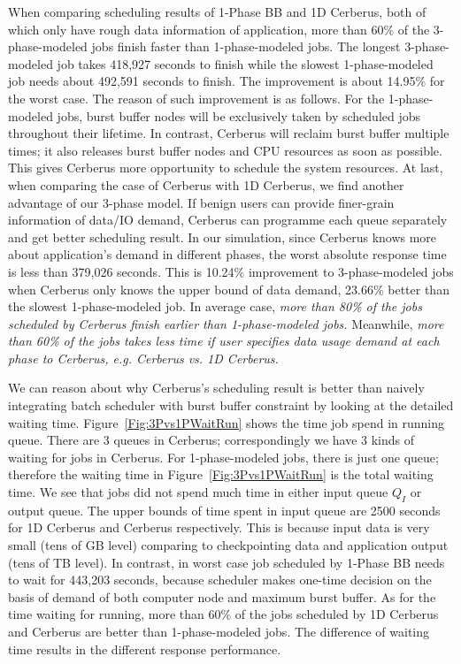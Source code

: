 When comparing scheduling results of 1-Phase BB and 1D Cerberus,
both of which only have rough data information of application,
more than 60\% of the 3-phase-modeled jobs finish faster than 1-phase-modeled jobs.
The longest 3-phase-modeled job takes 418,927 seconds to finish
while the slowest 1-phase-modeled job needs about 492,591 seconds to finish.
The improvement is about 14.95\% for the worst case.
The reason of such improvement is as follows.
For the 1-phase-modeled jobs, burst buffer nodes will be exclusively
taken by scheduled jobs throughout their lifetime.
In contrast, Cerberus will reclaim burst buffer multiple times;
it also releases burst buffer nodes and CPU resources as soon as possible.
This gives Cerberus more opportunity to schedule the system resources.
At last, when comparing the case of Cerberus with 1D Cerberus,
we find another advantage of our 3-phase model.
If benign users can provide finer-grain information of data/IO demand,
Cerberus can programme each queue separately and get better scheduling result.
In our simulation,
since Cerberus knows more about application's demand in different phases,
the worst absolute response time is less than 379,026 seconds.
This is 10.24\% improvement to 3-phase-modeled jobs
when Cerberus only knows the upper bound of data demand,
23.66\% better than the slowest 1-phase-modeled job.
In average case, \textit{more than 80\% of the jobs 
scheduled by Cerberus finish earlier than 1-phase-modeled jobs.}
Meanwhile, \textit{more than 60\% of the jobs takes less time if user 
specifies data usage demand at each phase to Cerberus, e.g. Cerberus vs. 1D Cerberus.}

We can reason about why Cerberus's scheduling result is better than
naively integrating batch scheduler with burst buffer constraint
by looking at the detailed waiting time.
Figure~\ref{Fig:3Pvs1PWaitRun} shows the time job spend in running queue.
There are 3 queues in Cerberus;
correspondingly we have 3 kinds of waiting for jobs in Cerberus.
For 1-phase-modeled jobs, there is just one queue;
therefore the waiting time in Figure~\ref{Fig:3Pvs1PWaitRun} is the total waiting time.
We see that jobs did not spend much time in either input queue $Q_I$ or output queue.
The upper bounds of time spent in input queue are
2500 seconds for 1D Cerberus and Cerberus respectively.
This is because input data is very small (tens of GB level)
comparing to checkpointing data and application output (tens of TB level).
In contrast, in worst case job scheduled by 1-Phase BB needs to wait for 443,203 seconds,
because scheduler makes one-time decision on the basis of demand of
both computer node and maximum burst buffer.
As for the time waiting for running, more than 60\% of the jobs scheduled by
1D Cerberus and Cerberus are better than 1-phase-modeled jobs.
The difference of waiting time results in the different
response performance.

